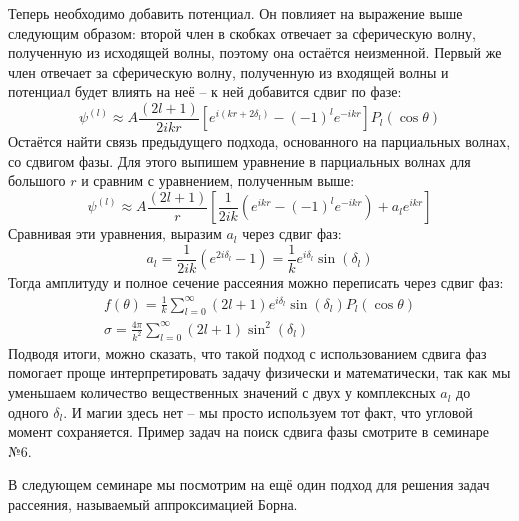 Теперь необходимо добавить потенциал. Он повлияет на выражение выше следующим
образом: второй член в скобках отвечает за сферическую волну, полученную из
исходящей волны, поэтому она остаётся неизменной. Первый же член отвечает за
сферическую волну, полученную из входящей волны и потенциал будет влиять на неё
-- к ней добавится сдвиг по фазе:
\[
  \psi^{(l)} \approx A\frac{(2l+1)}{2ikr}\left[ e^{i(kr+2\delta_l)} - (-1)^l e^{-ikr} \right] P_l(\cos\theta)
\]
Остаётся найти связь предыдущего подхода, основанного на парциальных волнах, со
сдвигом фазы. Для этого выпишем уравнение в парциальных волнах для большого $r$
и сравним с уравнением, полученным выше:
\[
  \psi^{(l)} \approx A\frac{(2l + 1)}{r}\left[ \frac{1}{2ik} \left(e^{ikr} - (-1)^l e^{-ikr}\right) + a_l e^{ikr} \right]
\]
Сравнивая эти уравнения, выразим $a_l$ через сдвиг фаз:
\[
  a_l = \frac{1}{2ik}\left(e^{2i\delta_l} - 1\right) = \frac{1}{k}e^{i\delta_l}\sin(\delta_l)
\]
Тогда амплитуду и полное сечение рассеяния можно переписать через сдвиг фаз:
\begin{gather*}
  f(\theta) = \frac{1}{k}\sum_{l=0}^{\infty}(2l+1)e^{i\delta_l}\sin(\delta_l)P_l(\cos\theta)\\
  \sigma = \frac{4\pi}{k^2}\sum_{l=0}^{\infty}(2l+1)\sin^2(\delta_l)
\end{gather*}
Подводя итоги, можно сказать, что такой подход с использованием сдвига фаз
помогает проще интерпретировать задачу физически и математически, так как мы
уменьшаем количество вещественных значений с двух у комплексных $a_l$ до одного
$\delta_l$. И магии здесь нет -- мы просто используем тот факт, что угловой
момент сохраняется. Пример задач на поиск сдвига фазы смотрите в семинаре №6.

В следующем семинаре мы посмотрим на ещё один подход для решения задач
рассеяния, называемый аппроксимацией Борна.